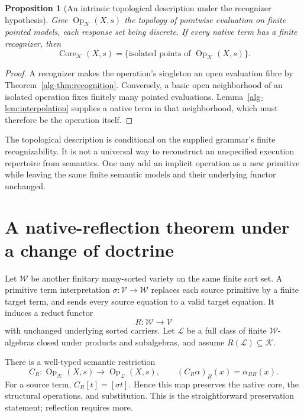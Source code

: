 \documentclass[11pt]{article}
\newtheorem{proposition}[theorem]{Proposition}
\theoremstyle{definition}
\theoremstyle{remark}
\newcommand{\Op}{\operatorname{Op}}
\newcommand{\Core}{\operatorname{Core}}
\begin{document}
\begin{proposition}[An intrinsic topological description under the
recognizer hypothesis]\label{alg-prop:isolated}
Give $\Op_{\mathcal K}(X,s)$ the topology of pointwise evaluation on
finite pointed models, each response set being discrete. If every native
term has a finite recognizer, then
\[
       \Core_{\mathcal K}(X,s)
       =\{\text{isolated points of }\Op_{\mathcal K}(X,s)\}.
\]
\end{proposition}
\begin{proof}
A recognizer makes the operation's singleton an open evaluation fibre by
Theorem~\ref{alg-thm:recognition}. Conversely, a basic open neighborhood of an
isolated operation fixes finitely many pointed evaluations.
Lemma~\ref{alg-lem:interpolation} supplies a native term in that neighborhood,
which must therefore be the operation itself.
\end{proof}
The topological description is conditional on the supplied grammar's
finite recognizability. It is not a universal way to reconstruct an
unspecified execution repertoire from semantics. One may add an implicit
operation as a new primitive while leaving the same finite semantic
models and their underlying functor unchanged.

\section{A native-reflection theorem under a change of doctrine}

Let $\mathcal W$ be another finitary many-sorted variety on the same
finite sort set. A primitive term interpretation
$\sigma:\mathcal V\to\mathcal W$ replaces each source primitive by a
finite target term, and sends every source equation to a valid target
equation. It induces a reduct functor
\[
           R:\mathcal W\longrightarrow\mathcal V
\]
with unchanged underlying sorted carriers. Let $\mathcal L$ be a full
class of finite $\mathcal W$-algebras closed under products and subalgebras,
and assume $R(\mathcal L)\subseteq\mathcal K$.

There is a well-typed semantic restriction
\begin{equation}\label{alg-eq:comparison}
 C_R:\Op_{\mathcal K}(X,s)\longrightarrow\Op_{\mathcal L}(X,s),
 \qquad (C_R\alpha)_B(x)=\alpha_{RB}(x).
\end{equation}
For a source term, $C_R[t]=[\sigma t]$. Hence this map preserves the native
core, the structural operations, and substitution. This is the
straightforward preservation statement; reflection requires more.
\end{document}
